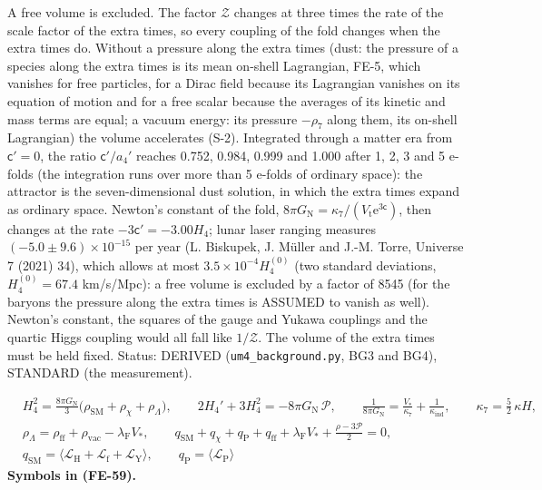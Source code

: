 \documentclass[
  10pt,
]{article}
\begin{document}
A free volume is excluded. The factor \(\mathcal{Z}\) changes at three
times the rate of the scale factor of the extra times, so every coupling
of the fold changes when the extra times do. Without a pressure along
the extra times (dust: the pressure of a species along the extra times
is its mean on-shell Lagrangian, FE-5, which vanishes for free
particles, for a Dirac field because its Lagrangian vanishes on its
equation of motion and for a free scalar because the averages of its
kinetic and mass terms are equal; a vacuum energy: its pressure
\(-\rho_7\) along them, its on-shell Lagrangian) the volume accelerates
(S-2). Integrated through a matter era from \(\mathsf{c}' = 0\), the
ratio \(\mathsf{c}'/a_4'\) reaches 0.752, 0.984, 0.999 and 1.000 after
1, 2, 3 and 5 e-folds (the integration runs over more than 5 e-folds of
ordinary space): the attractor is the seven-dimensional dust solution,
in which the extra times expand as ordinary space. Newton's constant of
the fold,
\(8\pi G_{\mathrm{N}} = \kappa_7/(V_{\mathrm{t}}\mathrm{e}^{3\mathsf{c}})\),
then changes at the rate \(-3\mathsf{c}' = -3.00H_4\); lunar laser
ranging measures \((-5.0 \pm 9.6)\times10^{-15}\) per year (L. Biskupek,
J. Müller and J.-M. Torre, Universe 7 (2021) 34), which allows at most
\(3.5\times10^{-4}H_4^{(0)}\) (two standard deviations,
\(H_4^{(0)} = 67.4\) km/s/Mpc): a free volume is excluded by a factor of
8545 (for the baryons the pressure along the extra times is ASSUMED to
vanish as well). Newton's constant, the squares of the gauge and Yukawa
couplings and the quartic Higgs coupling would all fall like
\(1/\mathcal{Z}\). The volume of the extra times must be held fixed.
Status: DERIVED (\texttt{um4\_background.py}, BG3 and BG4), STANDARD
(the measurement).

\[
\begin{aligned}
&H_4^2 = \frac{8\pi G_{\mathrm{N}}}{3}\big(\rho_{\mathrm{SM}} + \rho_\chi + \rho_\Lambda\big),\qquad
 2H_4' + 3H_4^2 = -8\pi G_{\mathrm{N}}\,\mathcal{P},\qquad
 \frac{1}{8\pi G_{\mathrm{N}}} = \frac{V_*}{\kappa_7} + \frac{1}{\kappa_{\mathrm{ind}}},\qquad \kappa_7 = \frac52\,\kappa H,\\
&\rho_\Lambda = \rho_{\mathrm{ff}} + \rho_{\mathrm{vac}} - \lambda_{\mathrm{F}}V_*,\qquad
 q_{\mathrm{SM}} + q_\chi + q_{\mathrm{P}} + q_{\mathrm{ff}} + \lambda_{\mathrm{F}}V_* + \frac{\rho - 3\mathcal{P}}{2} = 0,\\
&q_{\mathrm{SM}} = \big\langle\mathcal{L}_{\mathrm{H}} + \mathcal{L}_{\mathrm{f}} + \mathcal{L}_{\mathrm{Y}}\big\rangle,\qquad
 q_{\mathrm{P}} = \langle\mathcal{L}_{\mathrm{P}}\rangle
\end{aligned} \tag{FE-59}
\] \textbf{Symbols in (FE-59).}
\end{document}
